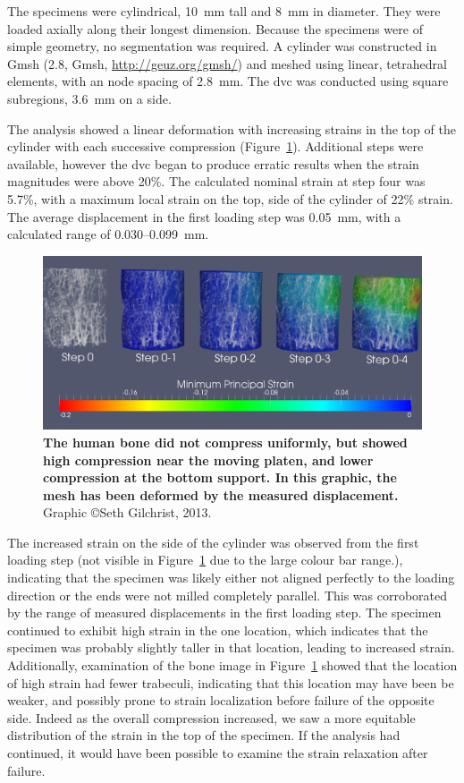 The specimens were cylindrical, 10~\ac{mm} tall and 8~\ac{mm} in diameter.
They were loaded axially along their longest dimension.
Because the specimens were of simple geometry, no segmentation was required.
A cylinder was constructed in Gmsh (2.8, Gmsh, \url{http://geuz.org/gmsh/}) and meshed using linear, tetrahedral elements, with an node spacing of 2.8~\ac{mm}.
The \ac{dvc} was conducted using square subregions, 3.6~\ac{mm} on a side.

The analysis showed a linear deformation with increasing strains in the top of the cylinder with each successive compression (Figure~\ref{fig:CompareSteps1-4WithBone}).
Additional steps were available, however the \ac{dvc} began to produce erratic results when the strain magnitudes were above 20\%.
The calculated nominal strain at step four was 5.7\%, with a maximum local strain on the top, side of the cylinder of 22\% strain.
The average displacement in the first loading step was 0.05~\ac{mm}, with a calculated range of 0.030--0.099~\ac{mm}.

\begin{figure}
\centering
\includegraphics[width=\linewidth]{./appendixDvc/figures/CompareSteps1-4WithBone}
\caption[Human bone compression]{\textbf{The human bone did not compress uniformly, but showed high compression near the moving platen, and lower compression at the bottom support. In this graphic, the mesh has been deformed by the measured displacement.} Graphic \copyright Seth Gilchrist, 2013.}
\label{fig:CompareSteps1-4WithBone}
\end{figure}

The increased strain on the side of the cylinder was observed from the first loading step (not visible in Figure~\ref{fig:CompareSteps1-4WithBone} due to the large colour bar range.), indicating that the specimen was likely either not aligned perfectly to the loading direction or the ends were not milled completely parallel.
This was corroborated by the range of measured displacements in the first loading step.
The specimen continued to exhibit high strain in the one location, which indicates that the specimen was probably slightly taller in that location, leading to increased strain.
Additionally, examination of the bone image in Figure~\ref{fig:CompareSteps1-4WithBone} showed that the location of high strain had fewer trabeculi, indicating that this location may have been be weaker, and possibly prone to strain localization before failure of the opposite side.
Indeed as the overall compression increased, we saw a more equitable distribution of the strain in the top of the specimen.
If the analysis had continued, it would have been possible to examine the strain relaxation after failure.

